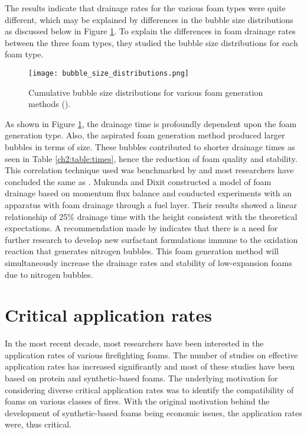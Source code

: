 The results indicate that drainage rates for the various foam types were quite different, which may be explained by differences in the bubble size distributions as discussed below in Figure \ref{ch2:figure:distributions}. To explain the differences in foam drainage rates between the three foam types, they studied the bubble size distributions for each foam type.

\begin{figure}[H]
    \centering
    \texttt{[image: bubble\_size\_distributions.png]}
    \caption{Cumulative bubble size distributions for various foam generation methods (\cite{laundess2012suppression}).}
    \label{ch2:figure:distributions}
\end{figure}

As shown in Figure \ref{ch2:figure:distributions}, the drainage time is profoundly dependent upon the foam generation type. Also, the aspirated foam generation method produced larger bubbles in terms of size. These bubbles contributed to shorter drainage times as seen in Table \ref{ch2:table:times}, hence the reduction of foam quality and stability. This correlation technique used was benchmarked by \cite{oguike2013study} and most researchers have concluded the same as \cite{laundess2012suppression}. Mukunda and Dixit \cite{csb2016phenomenological} constructed a model of foam drainage based on momentum flux balance and conducted experiments with an apparatus with foam drainage through a fuel layer. Their results showed a linear relationship of 25\% drainage time with the height consistent with the theoretical expectations. A recommendation made by \cite{laundess2012suppression} indicates that there is a need for further research to develop new surfactant formulations immune to the oxidation reaction that generates nitrogen bubbles. This foam generation method will simultaneously increase the drainage rates and stability of low-expansion foams due to nitrogen bubbles. 

\section{Critical application rates}
In the most recent decade, most researchers have been interested in the application rates of various firefighting foams. The number of studies on effective application rates has increased significantly and most of these studies have been based on protein and synthetic-based foams. The underlying motivation for considering diverse critical application rates was to identify the compatibility of foams on various classes of fires. With the original motivation behind the development of synthetic-based foams being economic issues, the application rates were, thus critical.

